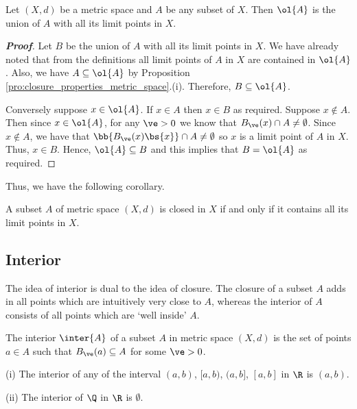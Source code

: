 \begin{theorem}
Let $(X,d)$ be a metric space and $A$ be any subset of $X$. Then $\ol{A}$ is the union of $A$ with all its limit points in $X$.
\end{theorem}

\begin{proof}[\bf Proof]
Let $B$ be the union of $A$ with all its limit points in $X$. We have already noted that from the definitions all limit points of $A$ in $X$ are contained in $\ol{A}$. Also, we have $A\subseteq \ol{A}$ by Proposition \ref{pro:closure_properties_metric_space}.(i). Therefore, $B\subseteq \ol{A}$.

Conversely suppose $x\in \ol{A}$. If $x\in A$ then $x\in B$ as required. Suppose $x\notin A$. Then since $x\in \ol{A}$, for any $\ve>0$ we know that $B_\ve(x)\cap A \neq \emptyset$. Since $x\notin A$, we have that $\bb{B_\ve(x)\bs{x}}\cap A \neq \emptyset$ so $x$ is a limit point of $A$ in $X$. Thus, $x\in B$. Hence, $\ol{A}\subseteq B$ and this implies that $B = \ol{A}$ as required.
\end{proof}

Thus, we have the following corollary.

\begin{corollary}\label{cor:closed_set_iff_contains_all_limit_points_metric}
A subset $A$ of metric space $(X,d)$ is closed in $X$ if and only if it contains all its limit points in $X$.
\end{corollary}


\subsection{Interior}

The idea of interior is dual to the idea of closure. The closure of a subset $A$ adds in all points which are intuitively very close to $A$, whereas the interior of $A$ consists of all points which
are `well inside' $A$.

\begin{definition}\label{def:interior}
The interior $\inter{A}$ of a subset $A$ in metric space $(X,d)$ is the set of points $a\in A$ such that $B_\ve(a)\subseteq A$ for some $\ve >0$.
\end{definition}

\begin{example}
\ben
\item [(i)] The interior of any of the interval $(a,b)$, $[a,b)$, $(a,b]$, $[a,b]$ in $\R$ is $(a,b)$.
\item [(ii)] The interior of $\Q$ in $\R$ is $\emptyset$.
\een
\end{example}




